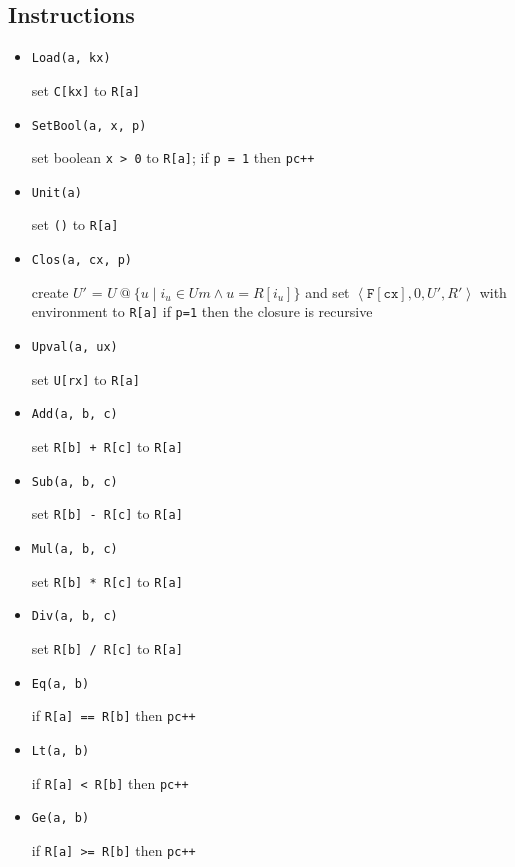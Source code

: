 \documentclass{article}
\begin{document}
\subsection{Instructions}
\begin{multicols}{2}
    \begin{itemize}
        \item \texttt{Load(a, kx)}

            set \texttt{C[kx]} to \texttt{R[a]}
        \item \texttt{SetBool(a, x, p)}

            set boolean \texttt{x > 0} to \texttt{R[a]};
            if \texttt{p = 1} then \texttt{pc++}
        \item \texttt{Unit(a)}

            set \texttt{()} to \texttt{R[a]}
        \item \texttt{Clos(a, cx, p)}

            create $U'$ = $U\ @\ \{u \mid i_u \in \mathit{Um} \wedge u = R[i_u]\}$
            and set $\left\langle \mathtt{F[cx]}, 0, U', R'\right\rangle$ with environment to \texttt{R[a]}
            if \texttt{p=1} then the closure is recursive
        \item \texttt{Upval(a, ux)}

            set \texttt{U[rx]} to \texttt{R[a]}
        \item \texttt{Add(a, b, c)}

            set \texttt{R[b] + R[c]} to \texttt{R[a]}
        \item \texttt{Sub(a, b, c)}

            set \texttt{R[b] - R[c]} to \texttt{R[a]}
        \item \texttt{Mul(a, b, c)}

            set \texttt{R[b] * R[c]} to \texttt{R[a]}
        \item \texttt{Div(a, b, c)}

            set \texttt{R[b] / R[c]} to \texttt{R[a]}
        \item \texttt{Eq(a, b)}

            if \texttt{R[a] == R[b]} then \texttt{pc++}
        \item \texttt{Lt(a, b)}

            if \texttt{R[a] < R[b]} then \texttt{pc++}
        \item \texttt{Ge(a, b)}

            if \texttt{R[a] >= R[b]} then \texttt{pc++}


\end{itemize}
\end{multicols}
\end{document}
